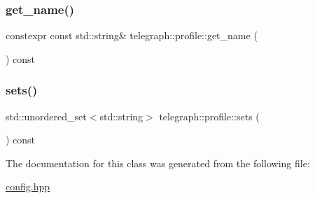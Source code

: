 \mbox{\label{classtelegraph_1_1profile_a93aee808f8bcec2ed60d2ab62a4a8249}} 
\subsubsection{\texorpdfstring{get\+\_\+name()}{get\_name()}}
{\footnotesize\ttfamily constexpr const std\+::string\& telegraph\+::profile\+::get\+\_\+name (\begin{DoxyParamCaption}{ }\end{DoxyParamCaption}) const\hspace{0.3cm}{\ttfamily [inline]}}

\mbox{\label{classtelegraph_1_1profile_aca410ddfb17eb8905541d28f668c4b9d}} 
\subsubsection{\texorpdfstring{sets()}{sets()}}
{\footnotesize\ttfamily std\+::unordered\+\_\+set$<$std\+::string$>$ telegraph\+::profile\+::sets (\begin{DoxyParamCaption}{ }\end{DoxyParamCaption}) const\hspace{0.3cm}{\ttfamily [inline]}}



The documentation for this class was generated from the following file\+:\begin{DoxyCompactItemize}
\item 
\hyperlink{config_8hpp}{config.\+hpp}\end{DoxyCompactItemize}
